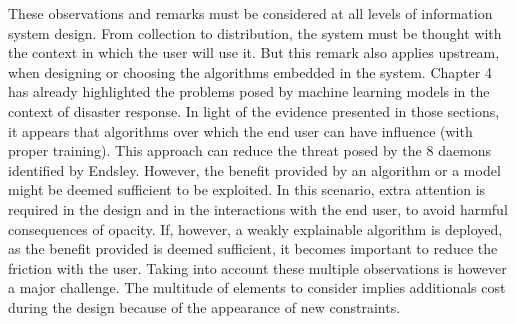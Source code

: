 These observations and remarks must be considered at all levels of information system design.
From collection to distribution, the system must be thought with the context in which the user will use it.
But this remark also applies upstream, when designing or choosing the algorithms embedded in the system.
Chapter 4 has already highlighted the problems posed by machine learning models in the context of disaster response.
In light of the evidence presented in those sections, it appears that algorithms over which the end user can have influence (with proper training).
This approach can reduce the threat posed by the 8 daemons identified by Endsley.
However, the benefit provided by an algorithm or a model might be deemed sufficient to be exploited.
In this scenario, extra attention is required in the design and in the interactions with
the end user, to avoid harmful consequences of opacity.
If, however, a weakly explainable algorithm is deployed, as the benefit provided is deemed sufficient, it becomes important to reduce the friction with the user.
Taking into account these multiple observations is however a major challenge.
The multitude of elements to consider implies additionals cost during the design because of the appearance of new constraints.

